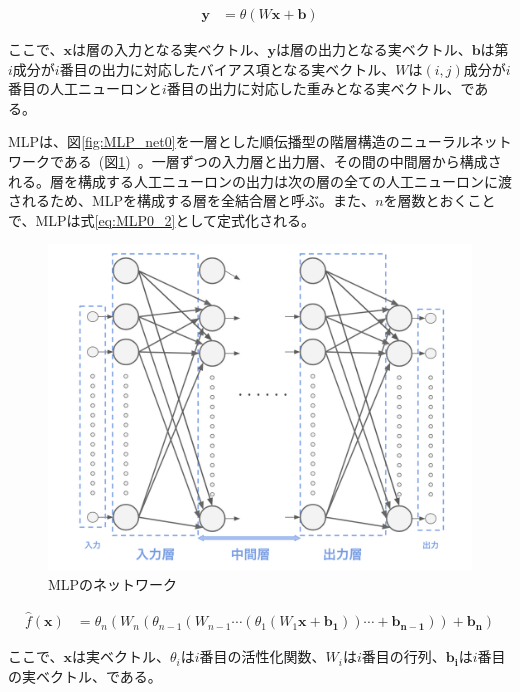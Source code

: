 \begin{align}
    \label{eq:MLP0_1}
    \boldsymbol{y}&=\theta(W\boldsymbol{x}+\boldsymbol{b})
\end{align}

ここで、$\boldsymbol{x}$は層の入力となる実ベクトル、$\boldsymbol{y}$は層の出力となる実ベクトル、$\boldsymbol{b}$は第$i$成分が$i$番目の出力に対応したバイアス項となる実ベクトル、$W$は$(i,j)$成分が$i$番目の人工ニューロンと$i$番目の出力に対応した重みとなる実ベクトル、である。

\clearpage

MLPは、図\ref{fig:MLP_net0}を一層とした順伝播型の階層構造のニューラルネットワークである~(図\ref{fig:MLP_net1})~。一層ずつの入力層と出力層、その間の中間層から構成される。層を構成する人工ニューロンの出力は次の層の全ての人工ニューロンに渡されるため、MLPを構成する層を全結合層と呼ぶ。また、$n$を層数とおくことで、MLPは式\ref{eq:MLP0_2}として定式化される。

\begin{figure}[b]
\begin{center}
\includegraphics[width=0.8\hsize]{figure/mlp_net1.png}
\caption{MLPのネットワーク}
\label{fig:MLP_net1}
\end{center}
\end{figure}

\begin{align}
    \label{eq:MLP0_2}
    \hat{f}(\boldsymbol{x})&=\theta_{n}(W_{n}(\theta_{n-1}(W_{n-1}\cdots(\theta_{1}(W_{1}\boldsymbol{x}+\boldsymbol{b_{1}}))\cdots+\boldsymbol{b_{n-1}}))+\boldsymbol{b_{n}})
\end{align}

ここで、$\boldsymbol{x}$は実ベクトル、$\theta_{i}$は$i$番目の活性化関数、$W_{i}$は$i$番目の行列、$\boldsymbol{b_{i}}$は$i$番目の実ベクトル、である。


